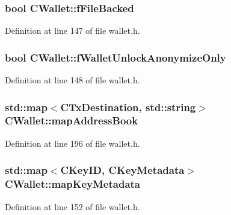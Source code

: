 \subsubsection[{f\+File\+Backed}]{\setlength{\rightskip}{0pt plus 5cm}bool C\+Wallet\+::f\+File\+Backed}\label{class_c_wallet_a1b2e285b4d7bd105c792941aa666249c}


Definition at line 147 of file wallet.\+h.

\hypertarget{class_c_wallet_add6767b414d652fc4acad99f4999d670}{}
\subsubsection[{f\+Wallet\+Unlock\+Anonymize\+Only}]{\setlength{\rightskip}{0pt plus 5cm}bool C\+Wallet\+::f\+Wallet\+Unlock\+Anonymize\+Only}\label{class_c_wallet_add6767b414d652fc4acad99f4999d670}


Definition at line 148 of file wallet.\+h.

\hypertarget{class_c_wallet_afed31f2489c987e0f76233121ed84ab7}{}
\subsubsection[{map\+Address\+Book}]{\setlength{\rightskip}{0pt plus 5cm}std\+::map$<${\bf C\+Tx\+Destination}, std\+::string$>$ C\+Wallet\+::map\+Address\+Book}\label{class_c_wallet_afed31f2489c987e0f76233121ed84ab7}


Definition at line 196 of file wallet.\+h.

\hypertarget{class_c_wallet_acfd09bc5a2daee930f9f988efac8dbb7}{}
\subsubsection[{map\+Key\+Metadata}]{\setlength{\rightskip}{0pt plus 5cm}std\+::map$<${\bf C\+Key\+I\+D}, {\bf C\+Key\+Metadata}$>$ C\+Wallet\+::map\+Key\+Metadata}\label{class_c_wallet_acfd09bc5a2daee930f9f988efac8dbb7}


Definition at line 152 of file wallet.\+h.

